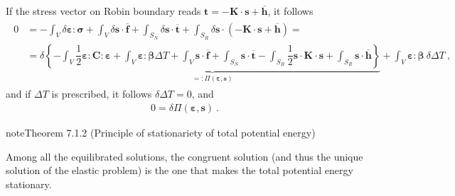 \documentclass[letterpaper,10pt,english]{jupyterBook}
\begin{document}
\sphinxAtStartPar
If the stress vector on Robin boundary reads \(\mathbf{t} = - \mathbf{K} \cdot \mathbf{s} + \overline{\mathbf{h}}\), it follows
\begin{equation*}
\begin{split}\begin{aligned}
 0 & = - \int_V \delta \boldsymbol\varepsilon : \boldsymbol\sigma + \int_{V} \delta \mathbf{s} \cdot \overline{\mathbf{f}} + \int_{S_N} \delta \mathbf{s} \cdot \overline{\mathbf{t}} + \int_{S_R} \delta \mathbf{s} \cdot \left( - \mathbf{K} \cdot \mathbf{s} + \overline{\mathbf{h}} \right) = \\ 
   & = \delta \underbrace{\left\{ - \int_V \dfrac{1}{2} \boldsymbol\varepsilon : \mathbf{C} : \boldsymbol\varepsilon + \int_{V} \boldsymbol\varepsilon : \boldsymbol\beta \Delta T + \int_{V} \mathbf{s} \cdot \overline{\mathbf{f}} + \int_{S_N} \mathbf{s} \cdot \overline{\mathbf{t}} - \int_{S_R} \dfrac{1}{2}\mathbf{s} \cdot \mathbf{K} \cdot \mathbf{s} + \int_{S_R} \mathbf{s} \cdot \overline{\mathbf{h}} \right\}}_{ =: \Pi(\boldsymbol\varepsilon, \mathbf{s})} + \int_{V} \boldsymbol\varepsilon : \boldsymbol\beta \ \delta \Delta T \ , 
\end{aligned}\end{split}
\end{equation*}
\sphinxAtStartPar
and if \(\Delta T\) is prescribed, it follows \(\delta \Delta T = 0\), and
\begin{equation*}
\begin{split}0 = \delta \Pi(\boldsymbol\varepsilon, \mathbf{s}) \ . \end{split}
\end{equation*}\label{ch/solids/small-displacements-statics-weak-form-3d:theorem-1}
\begin{sphinxadmonition}{note}{Theorem 7.1.2 (Principle of stationariety of total potential energy)}



\sphinxAtStartPar
Among all the equilibrated solutions, the congruent solution (and thus the unique solution of the elastic problem) is the one that makes the total potential energy stationary.
\end{sphinxadmonition}
\end{document}
